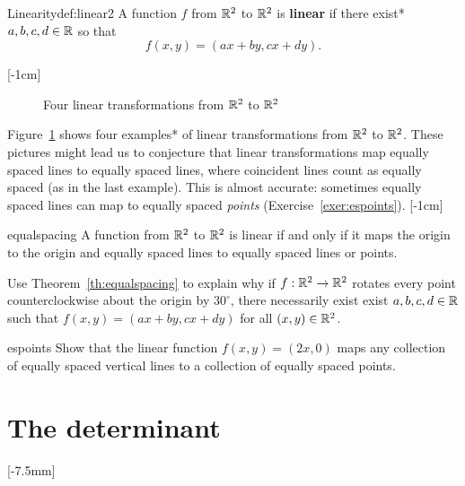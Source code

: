 \documentclass[svgnames]{watsonbook}
\begin{document}
\begin{defn}{Linearity}{def:linear2}
  A function $f$ from $\mathbb{R}^2$ to $\mathbb{R}^2$ is \textbf{linear} if there exist*
  $a,b,c,d \in \mathbb{R}$ so that 
  \[
    f(x,y) = (ax + by , cx + dy). 
  \]
\end{defn}
[-1cm]

\begin{figure}[h!]

\caption{Four linear transformations from $\mathbb{R}^2$ to $\mathbb{R}^2$ \label{fig:four_trans}}
\end{figure}

Figure~\ref{fig:four_trans} shows four examples* of linear
transformations from $\mathbb{R}^2$ to $\mathbb{R}^2$. These pictures might lead us to
conjecture that linear transformations map equally spaced lines to
equally spaced lines, where coincident lines count as equally spaced
(as in the last example). This is almost accurate: sometimes equally
spaced lines can map to equally spaced \textit{points}
(Exercise~\ref{exer:espoints}). [-1cm]

\begin{theo}{}{equalspacing}
  A function from $\mathbb{R}^2$ to $\mathbb{R}^2$ is linear if and only if it maps
  the origin to the origin and equally spaced lines to equally spaced
  lines or points.
\end{theo}

\begin{exercise}{}{}
  Use Theorem~\ref{th:equalspacing} to explain why if $f : \mathbb{R}^2 \to
  \mathbb{R}^2$ rotates every point counterclockwise about the origin by $30^\circ$, there
  necessarily exist exist $a,b,c,d\in\mathbb{R}$ such that $f(x,y) = (ax+ by,
  cx+ dy)$ for all $(x,y) \in\mathbb{R}^2$. 
\end{exercise}

\begin{exercise}{}{espoints}
  Show that the linear function $f(x,y)=(2x,0)$ maps any collection of
  equally spaced vertical lines to a collection of equally spaced points.
\end{exercise}

\section{The determinant} \label{sec:det} 

[-7.5mm]
\end{document}
